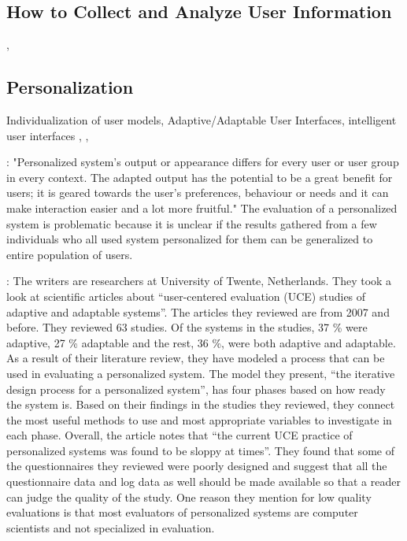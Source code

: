\documentclass{sigchi}
\begin{document}
\subsection{How to Collect and Analyze User Information}
\cite{pazzani97}, \cite{white10}

\subsection{Personalization}
Individualization of user models, Adaptive/Adaptable User Interfaces, intelligent user interfaces
\cite{bunt04}, \cite{findlater04}, \cite{brusi96}

\cite{van08}: "Personalized system's output or appearance differs for every user or user group in every context. The adapted output has the potential to be a great benefit for users; it is geared towards the user's preferences, behaviour or needs and it can make interaction easier and a lot more fruitful." The evaluation of a personalized system is problematic because it is unclear if the results gathered from a few individuals who all used system personalized for them can be generalized to entire population of users.

\cite{van08}: The writers are researchers at University of Twente, Netherlands. They took a look at scientific articles about “user-centered evaluation (UCE) studies of adaptive and adaptable systems”. The articles they reviewed are from 2007 and before. They reviewed 63 studies. Of the systems in the studies, 37 \% were adaptive, 27 \% adaptable and the rest, 36 \%, were both adaptive and adaptable. As a result of their literature review, they have modeled a process that can be used in evaluating a personalized system.
The model they present, “the iterative design process for a personalized system”, has four phases based on how ready the system is. Based on their findings in the studies they reviewed, they connect the most useful methods to use and most appropriate variables to investigate in each phase.
Overall, the article notes that “the current UCE practice of personalized systems was found to be sloppy at times”. They found that some of the questionnaires they reviewed were poorly designed and suggest that all the questionnaire data and log data as well should be made available so that a reader can judge the quality of the study. One reason they mention for low quality evaluations is that most evaluators of personalized systems are computer scientists and not specialized in evaluation.
\end{document}
